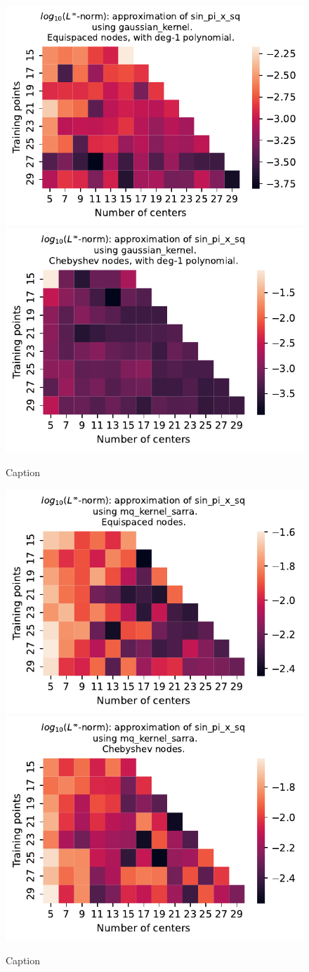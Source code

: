 \documentclass[12pt]{report} %
\begin{document}
\begin{figure}[ht]
  \centering

  \includegraphics[width=.49\textwidth]{imagenes/experiments/1d/variational/sin_pi_x_sq-Kgaussian_kernel-Poly-Equi.pdf}
  \includegraphics[width=.49\textwidth]{imagenes/experiments/1d/variational/sin_pi_x_sq-Kgaussian_kernel-Poly-Cheb.pdf}
  \caption{Caption}
  \label{fig:sin-pi-x-sq-gaussian-poly}
\end{figure}


\begin{figure}[ht]
  \centering

  \includegraphics[width=.49\textwidth]{imagenes/experiments/1d/variational/sin_pi_x_sq-Kmq_kernel_sarra-Equi.pdf}
  \includegraphics[width=.49\textwidth]{imagenes/experiments/1d/variational/sin_pi_x_sq-Kmq_kernel_sarra-Cheb.pdf}
  \caption{Caption}
  \label{fig:sin-pi-x-sq-sarra}
\end{figure}
\end{document}
